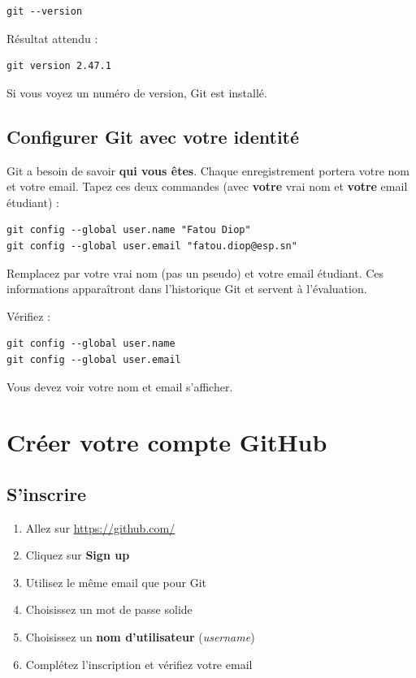 \documentclass[11pt,a4paper]{article}
\newcommand{\cmark}{\ding{51}}
\begin{document}
\begin{lstlisting}
git --version
\end{lstlisting}

Résultat attendu :

\begin{lstlisting}
git version 2.47.1
\end{lstlisting}

\cmark{} Si vous voyez un numéro de version, Git est installé.

\subsection{Configurer Git avec votre identité}

Git a besoin de savoir \textbf{qui vous êtes}. Chaque enregistrement portera
votre nom et votre email. Tapez ces deux commandes (avec \textbf{votre}
vrai nom et \textbf{votre} email étudiant) :

\begin{lstlisting}
git config --global user.name "Fatou Diop"
git config --global user.email "fatou.diop@esp.sn"
\end{lstlisting}

\begin{attentionbox}
Remplacez par votre vrai nom (pas un pseudo) et votre email étudiant. Ces
informations apparaîtront dans l'historique Git et servent à l'évaluation.
\end{attentionbox}

Vérifiez :
\begin{lstlisting}
git config --global user.name
git config --global user.email
\end{lstlisting}

Vous devez voir votre nom et email s'afficher. \cmark

\newpage

\section{Créer votre compte GitHub}

\subsection{S'inscrire}

\begin{enumerate}[nosep]
    \item Allez sur \url{https://github.com/}
    \item Cliquez sur \textbf{Sign up}
    \item Utilisez le même email que pour Git
    \item Choisissez un mot de passe solide
    \item Choisissez un \textbf{nom d'utilisateur} (\emph{username})
    \item Complétez l'inscription et vérifiez votre email
\end{enumerate}
\end{document}
